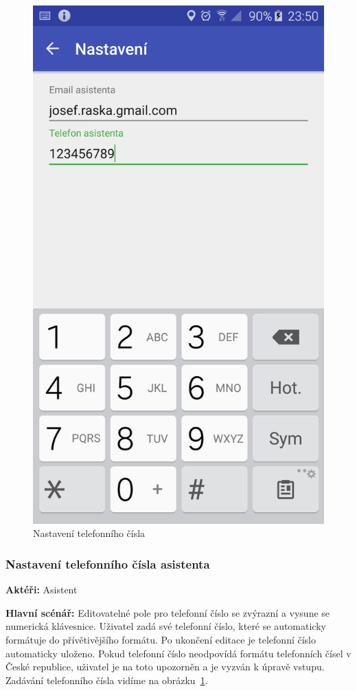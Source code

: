 \documentclass[czech,master,public,dept460,male,java,cpdeclaration]{diploma}
\newcommand{\usecase}[2]{\subsubsection{#1}\label{#2}}
\begin{document}
\begin{figure}[H]
\begin{minipage}{.5\textwidth}
                \includegraphics[scale=0.14]{img/screen/nastaveniasistent.png}
        \caption{Nastavení telefonního čísla}
        \label{fig:nastavenicisla}
    \end{minipage}
\end{figure}

\usecase{Nastavení telefonního čísla asistenta}{nastavenicisla}
\textbf{Aktéři:} Asistent

\vspace{0.1cm}
\noindent
\textbf{Hlavní scénář:} Editovatelné pole pro telefonní číslo se zvýrazní a vysune se numerická klávesnice.
Uživatel zadá své telefonní číslo, které se automaticky formátuje do přívětivějšího formátu. Po ukončení
editace je telefonní číslo automaticky uloženo. Pokud telefonní číslo neodpovídá formátu telefonních čísel
v České republice, uživatel je na toto upozorněn a je vyzván k úpravě vstupu. Zadávání telefonního čísla
vidíme na obrázku~\ref{fig:nastavenicisla}.
\end{document}
